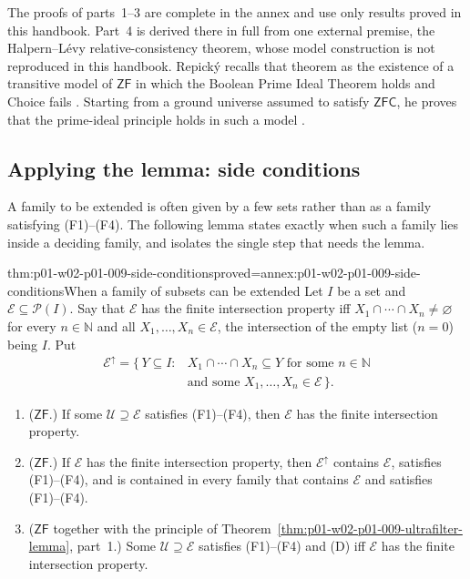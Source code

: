 The proofs of parts~1--3 are complete in the annex and use only results
proved in this handbook. Part~4 is derived there in full from one external
premise, the Halpern--L\'evy relative-consistency theorem, whose model
construction is not reproduced in this handbook. Repick\'y recalls that
theorem as the existence of a transitive model of \(\mathsf{ZF}\) in which the
Boolean Prime Ideal Theorem holds and Choice fails
\cite[p.~543, Theorem~1]{Repicky2015BPI}. Starting from a ground universe
assumed to satisfy \(\mathsf{ZFC}\), he proves that the prime-ideal principle
holds in such a model \cite[pp.~543--546]{Repicky2015BPI}.

\subsection{Applying the lemma: side conditions}
\label{sec:p01-w02-p01-009-side-conditions}

A family to be extended is often given by a few sets rather than as a
family satisfying (F1)--(F4). The following lemma states exactly when such a
family lies inside a deciding family, and isolates the single step that needs
the lemma.

\begin{hblemma}{thm:p01-w02-p01-009-side-conditions}{proved=annex:p01-w02-p01-009-side-conditions}{When a family of subsets can be extended}
Let \(I\) be a set and \(\mathcal E\subseteq\mathcal P(I)\). Say that
\(\mathcal E\) has the finite intersection property iff
\(X_1\cap\cdots\cap X_n\ne\varnothing\) for every \(n\in\mathbb N\) and all
\(X_1,\ldots,X_n\in\mathcal E\), the intersection of the empty list (\(n=0\))
being \(I\). Put
\[
  \begin{aligned}
  \mathcal E^{\uparrow}=\{\,Y\subseteq I:{}&X_1\cap\cdots\cap X_n\subseteq Y
  \text{ for some }n\in\mathbb N\\
  &\text{and some }X_1,\ldots,X_n\in\mathcal E\,\}.
  \end{aligned}
\]
\begin{enumerate}
  \item (\(\mathsf{ZF}\).) If some \(\mathcal U\supseteq\mathcal E\) satisfies
    (F1)--(F4), then \(\mathcal E\) has the finite intersection property.
  \item (\(\mathsf{ZF}\).) If \(\mathcal E\) has the finite intersection
    property, then \(\mathcal E^{\uparrow}\) contains \(\mathcal E\),
    satisfies (F1)--(F4), and is contained in every family that contains
    \(\mathcal E\) and satisfies (F1)--(F4).
  \item (\(\mathsf{ZF}\) together with the principle of
    Theorem~\ref{thm:p01-w02-p01-009-ultrafilter-lemma}, part~1.) Some
    \(\mathcal U\supseteq\mathcal E\) satisfies (F1)--(F4) and (D) iff
    \(\mathcal E\) has the finite intersection property.
\end{enumerate}
\end{hblemma}

